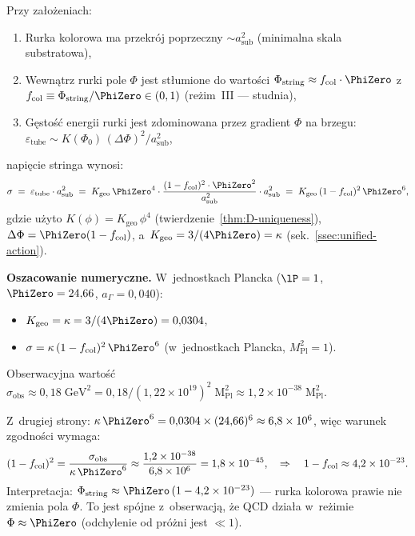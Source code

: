 \begin{proposition}%
\label{prop:sigma-estimate}
Przy założeniach:
\begin{enumerate}[nosep]
    \item[(S1)] Rurka kolorowa ma przekrój poprzeczny $\sim a_{\mathrm{sub}}^2$
          (minimalna skala substratowa),
    \item[(S2)] Wewnątrz rurki pole $\Phi$ jest stłumione do wartości
          $\Phi_{\mathrm{string}} \approx f_{\mathrm{col}} \cdot \PhiZero$
          z~$f_{\mathrm{col}} \equiv \Phi_{\mathrm{string}}/\PhiZero
          \in (0,1)$ (reżim~III --- studnia),
    \item[(S3)] Gęstość energii rurki jest zdominowana przez gradient
          $\Phi$ na brzegu: $\varepsilon_{\mathrm{tube}}
          \sim K(\Phi_0)\,(\Delta\Phi)^2 / a_{\mathrm{sub}}^2$,
\end{enumerate}
napięcie stringa wynosi:
\begin{equation}\label{eq:sigma-from-TGP}
    \sigma \;=\; \varepsilon_{\mathrm{tube}} \cdot a_{\mathrm{sub}}^2
    \;=\; K_{\mathrm{geo}}\,\PhiZero^4 \cdot
    \frac{(1 - f_{\mathrm{col}})^2 \cdot \PhiZero^2}{a_{\mathrm{sub}}^2}
    \cdot a_{\mathrm{sub}}^2
    \;=\; K_{\mathrm{geo}}\,(1 - f_{\mathrm{col}})^2\,\PhiZero^6,
\end{equation}
gdzie użyto $K(\phi) = K_{\mathrm{geo}}\,\phi^4$
(twierdzenie~\ref{thm:D-uniqueness}),
$\Delta\Phi = \PhiZero(1 - f_{\mathrm{col}})$,
a~$K_{\mathrm{geo}} = 3/(4\PhiZero) = \kappa$ (sek.~\ref{ssec:unified-action}).

\noindent\textbf{Oszacowanie numeryczne.}
W~jednostkach Plancka ($\lP = 1$, $\PhiZero = 24{,}66$,
$a_{\Gamma} = 0{,}040$):
\begin{itemize}[nosep]
    \item $K_{\mathrm{geo}} = \kappa = 3/(4\PhiZero) = 0{,}0304$,
    \item $\sigma = \kappa\,(1-f_{\mathrm{col}})^2\,\PhiZero^6$
          (w~jednostkach Plancka, $M_{\mathrm{Pl}}^2 = 1$).
\end{itemize}
Obserwacyjna wartość $\sigma_{\mathrm{obs}} \approx 0{,}18\;\mathrm{GeV}^2
= 0{,}18/(1{,}22\times 10^{19})^2\;\mathrm{M_{Pl}^2}
\approx 1{,}2 \times 10^{-38}\;\mathrm{M_{Pl}^2}$.

Z~drugiej strony:
$\kappa\,\PhiZero^6 = 0{,}0304 \times (24{,}66)^6 \approx 6{,}8 \times 10^{6}$,
więc warunek zgodności wymaga:
\begin{equation}\label{eq:fcol-from-sigma}
    (1 - f_{\mathrm{col}})^2 = \frac{\sigma_{\mathrm{obs}}}{\kappa\,\PhiZero^6}
    \approx \frac{1{,}2 \times 10^{-38}}{6{,}8 \times 10^{6}}
    = 1{,}8 \times 10^{-45},
    \quad\Rightarrow\quad
    1 - f_{\mathrm{col}} \approx 4{,}2 \times 10^{-23}.
\end{equation}
Interpretacja: $\Phi_{\mathrm{string}} \approx \PhiZero\,(1 - 4{,}2\times 10^{-23})$
--- rurka kolorowa prawie nie zmienia pola $\Phi$.
To jest spójne z~obserwacją, że QCD działa w~reżimie
$\Phi \approx \PhiZero$ (odchylenie od próżni jest $\ll 1$).
\end{proposition}

